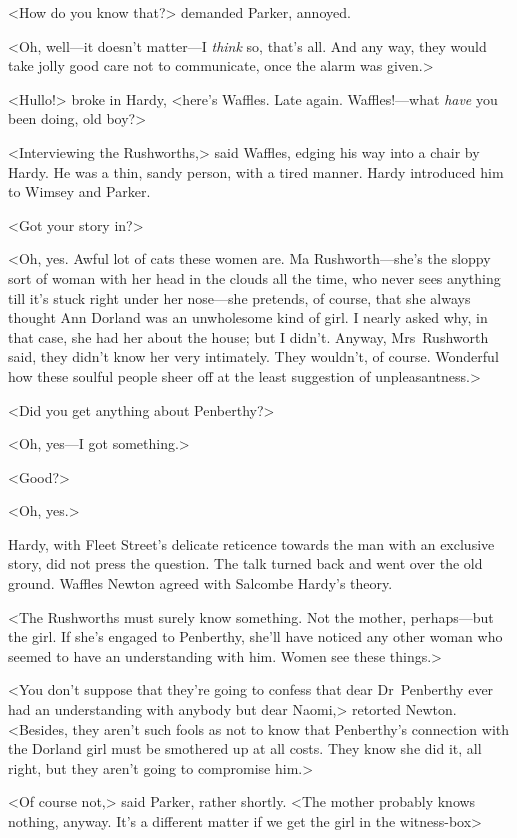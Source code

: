 <How do you know that?> demanded Parker, annoyed.

<Oh, well—it doesn't matter—I \emph{think} so, that's all. And any way, they would take jolly good care not to communicate, once the alarm was given.>

<Hullo!> broke in Hardy, <here's Waffles. Late again. Waffles!—what \emph{have} you been doing, old boy?>

<Interviewing the Rushworths,> said Waffles, edging his way into a chair by Hardy. He was a thin, sandy person, with a tired manner. Hardy introduced him to Wimsey and Parker.

<Got your story in?>

<Oh, yes. Awful lot of cats these women are. Ma Rushworth—she's the sloppy sort of woman with her head in the clouds all the time, who never sees anything till it's stuck right under her nose—she pretends, of course, that she always thought Ann Dorland was an unwholesome kind of girl. I nearly asked why, in that case, she had her about the house; but I didn't. Anyway, Mrs~Rushworth said, they didn't know her very intimately. They wouldn't, of course. Wonderful how these soulful people sheer off at the least suggestion of unpleasantness.>

<Did you get anything about Penberthy?>

<Oh, yes—I got something.>

<Good?>

<Oh, yes.>

Hardy, with Fleet Street's delicate reticence towards the man with an exclusive story, did not press the question. The talk turned back and went over the old ground. Waffles Newton agreed with Salcombe Hardy's theory.

<The Rushworths must surely know something. Not the mother, perhaps—but the girl. If she's engaged to Penberthy, she'll have noticed any other woman who seemed to have an understanding with him. Women see these things.>

<You don't suppose that they're going to confess that dear Dr~Penberthy ever had an understanding with anybody but dear Naomi,> retorted Newton. <Besides, they aren't such fools as not to know that Penberthy's connection with the Dorland girl must be smothered up at all costs. They know she did it, all right, but they aren't going to compromise him.>

<Of course not,> said Parker, rather shortly. <The mother probably knows nothing, anyway. It's a different matter if we get the girl in the witness-box\longdash>

